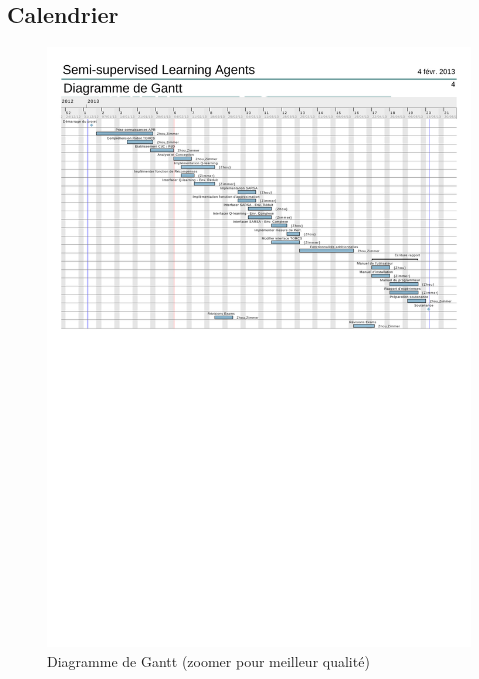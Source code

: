 \documentclass[a4paper,12pt]{article}
\begin{document}
    \subsection{Calendrier} 
      \begin{figure}[H]
	\centerline{\includegraphics[width=20cm, clip=true, trim= 0 440 0 72]{../images/Gantt.pdf} }
	\caption{Diagramme de Gantt \scriptsize{(zoomer pour meilleur qualité)}}
      \end{figure}


	

	
\begin{center}

\end{center}
\end{document}
